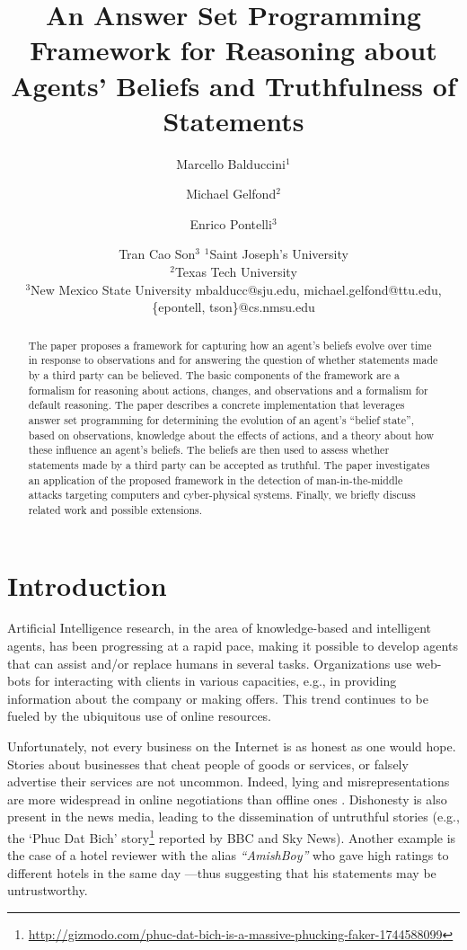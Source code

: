 \documentclass{article}
\title{An Answer Set Programming Framework for Reasoning about Agents' Beliefs and Truthfulness of Statements} %
\author{Marcello Balduccini$^1$ \and 
Michael Gelfond$^2$ \and
Enrico Pontelli$^3$ \and 
Tran Cao Son$^3$ 
\affiliations
$^1$Saint Joseph's University \\ 
$^2$Texas Tech University\\ 
$^3$New Mexico State University
\emails
   mbalducc@sju.edu,   
   michael.gelfond@ttu.edu,
\{epontell, tson\}@cs.nmsu.edu 
} %
\begin{document}
  

\label{firstpage}


\maketitle

\begin{abstract}
The paper proposes a framework for capturing how an agent’s beliefs evolve over time  in response to observations and for answering the question of whether  statements 
made by a third party can be believed. The basic components of the framework are a formalism for 
reasoning about actions, changes, and observations and a formalism for default reasoning. 
The paper describes a concrete implementation that leverages answer set programming for   
determining the evolution of an agent's ``belief state'', based on observations, knowledge about the effects of actions, and a theory about how these influence an agent's beliefs. 
The beliefs are then used to assess whether statements made by a third party can be accepted as truthful. The paper investigates an application of the 
proposed framework in the detection of
 man-in-the-middle attacks targeting computers and cyber-physical systems. 
Finally, we briefly 
discuss related work   and   possible extensions. 
\end{abstract}



\section{Introduction} 

Artificial Intelligence research, in the area of knowledge-based and intelligent agents, has been progressing at
a rapid pace, making it possible to develop agents that can assist and/or replace humans in 
several tasks. Organizations  use  web-bots for interacting with clients in various capacities, e.g., in providing information about the company or making offers. This trend continues to be fueled by the ubiquitous use of online resources. 

Unfortunately, not every business on the Internet is as 
honest as one would hope. Stories about businesses that cheat people of goods or services, or falsely advertise their services are not uncommon. Indeed, lying and misrepresentations are more widespread in online negotiations than 
offline ones \cite{elie}. Dishonesty is also present in
the news media, leading to the dissemination of untruthful stories  (e.g., the `Phuc Dat Bich' story\footnote{ 
{\tiny
\url{http://gizmodo.com/phuc-dat-bich-is-a-massive-phucking-faker-1744588099}
}} reported by BBC and Sky News). Another example is the case of a hotel reviewer with the alias {\em ``AmishBoy''} who gave high ratings to different hotels in the same day \cite{MinnichCMLF15}---thus suggesting  that his statements may be untrustworthy.  
\end{document}
